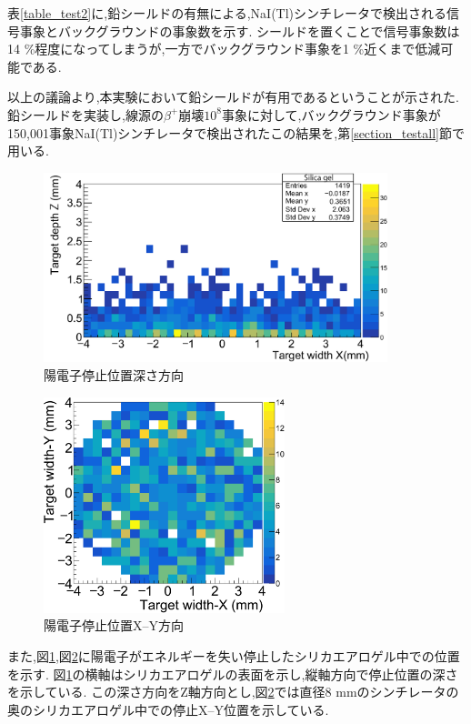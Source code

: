 表\ref{table_test2}に,鉛シールドの有無による,NaI(Tl)シンチレータで検出される信号事象とバックグラウンドの事象数を示す.
シールドを置くことで信号事象数は14 \%程度になってしまうが,一方でバックグラウンド事象を1 \%近くまで低減可能である.

以上の議論より,本実験において鉛シールドが有用であるということが示された.
鉛シールドを実装し,線源の$\beta^+$崩壊$10^8$事象に対して,バックグラウンド事象が150,001事象NaI(Tl)シンチレータで検出されたこの結果を,第\ref{section_testall}節で用いる.

\begin{figure}[!tbp]
	\centering
		\includegraphics[width=10cm]{fig/test2bXY.pdf}
	\caption[陽電子停止位置深さ方向]{陽電子停止位置深さ方向}
	\label{test2bXY}
\end{figure}

\begin{figure}[!tbp]
	\centering
		\includegraphics[width=7cm]{fig/test2bYZ.pdf}
	\caption[陽電子停止位置X--Y方向]{陽電子停止位置X--Y方向}
	\label{test2bYZ}
\end{figure}



また,図\ref{test2bXY},図\ref{test2bYZ}に陽電子がエネルギーを失い停止したシリカエアロゲル中での位置を示す.
図\ref{test2bXY}の横軸はシリカエアロゲルの表面を示し,縦軸方向で停止位置の深さを示している.
この深さ方向をZ軸方向とし,図\ref{test2bYZ}では直径8 mmのシンチレータの奥のシリカエアロゲル中での停止X--Y位置を示している.

